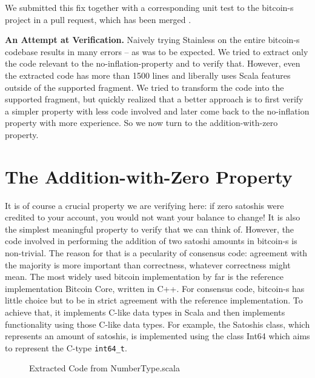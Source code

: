 \documentclass[runningheads]{llncs}
\renewcommand{\paragraph}{\textbf}%
\begin{document}
We submitted this fix together with a corresponding unit test to the
bitcoin-s project in a pull request, which has been merged
\cite{BitcoinS:pull435}.


\paragraph{An Attempt at Verification.} Naively trying Stainless on
the entire bitcoin-s codebase results in many errors -- as was to be
expected. We tried to extract only the code relevant to the
no-inflation-property and to verify that. However, even the extracted
code has more than 1500 lines and liberally uses Scala features
outside of the supported fragment.  We tried to transform the code
into the supported fragment, but quickly realized that a better
approach is to first verify a simpler property with less code involved
and later come back to the no-inflation property with more
experience. So we now turn to the addition-with-zero property.




\section{The Addition-with-Zero Property}

It is of course a crucial property we are verifying here: if zero
satoshis were credited to your account, you would not want your
balance to change! It is also the simplest meaningful property to
verify that we can think of. However, the code involved in performing
the addition of two satoshi amounts in bitcoin-s is non-trivial. The
reason for that is a pecularity of consensus code: agreement with the
majority is more important than correctness, whatever correctness
might mean. The most widely used bitcoin implementation by far is the
reference implementation Bitcoin Core, written in C++. For consensus
code, bitcoin-s has little choice but to be in strict agreement with
the reference implementation. To achieve that, it implements C-like
data types in Scala and then implements functionality using those
C-like data types. For example, the Satoshis class, which represents
an amount of satoshis, is implemented using the class Int64 which
aims to represent the C-type \texttt{int64\_t}.

\begin{figure}

  \caption{Extracted Code from NumberType.scala}
  \label{fig:numbertype}
\end{figure}
\end{document}
